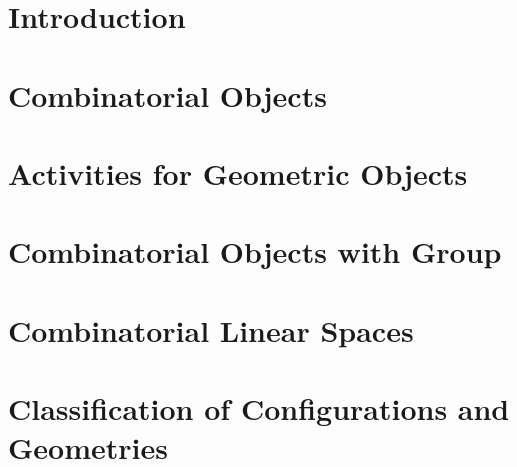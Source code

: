 \section{Introduction}
\label{sec:combinatorics:intro}




\bigskip


\clearpage


\section{Combinatorial Objects}
\label{sec:combo}




\bigskip


\clearpage



\section{Activities for Geometric Objects}
\label{sec:geometric:objects:activities}






\bigskip

\clearpage





\section{Combinatorial Objects with Group}
\label{sec:combo:with:group}




\bigskip


\clearpage


\section{Combinatorial Linear Spaces}
\label{sec:combinatorial:linear:spaces}




\bigskip


\clearpage


\section{Classification of Configurations and Geometries}
\label{sec:configurations}


